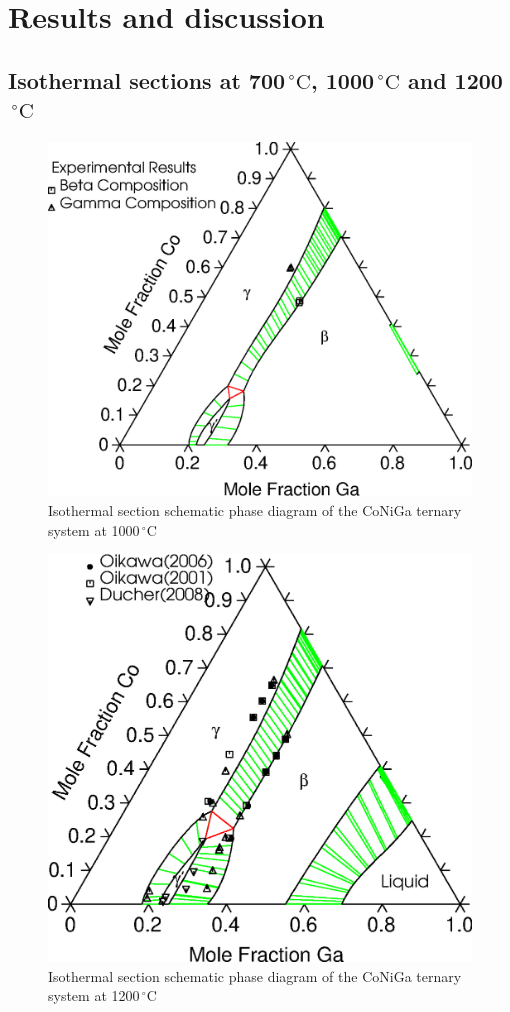 \documentclass[article]{elsarticle}
\begin{document}
\section{Results and discussion}
\subsection{Isothermal sections at 700$\,^{\circ}\mathrm{C}$, 1000$\,^{\circ}\mathrm{C}$ and 1200$\,^{\circ}\mathrm{C}$}
\begin{figure}
\centering
\includegraphics[scale =0.45]{1473_isothermal}
\caption{Isothermal section schematic phase diagram of the CoNiGa ternary system at 1000$\,^{\circ}\mathrm{C}$}
\label{1273}
\end{figure}
\begin{figure}
\centering
\includegraphics[scale =0.45]{1273_isothermal}
\caption{Isothermal section schematic phase diagram of the CoNiGa
ternary system at 1200$\,^{\circ}\mathrm{C}$}
\label{1473}
\end{figure}
\end{document}

